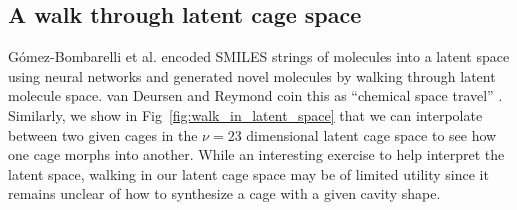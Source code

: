 \documentclass[journal=jacsat,manuscript=article,layout=traditional]{achemso}
\begin{document}
\subsection{A walk through latent cage space}
\label{sec:latentwalk}
G\'{o}mez-Bombarelli et al. \cite{gomez2018automatic} encoded SMILES strings of molecules into a latent space using neural networks and generated novel molecules by walking through latent molecule space. van Deursen and Reymond coin this as ``chemical space travel'' \cite{van2007chemical}. Similarly, we show in Fig~\ref{fig:walk_in_latent_space} that we can interpolate between two given cages in the $\nu=23$ dimensional latent cage space to see how one cage morphs into another.
While an interesting exercise to help interpret the latent space, walking in our latent cage space may be of limited utility since it remains unclear of how to synthesize a cage with a given cavity shape.
\end{document}
